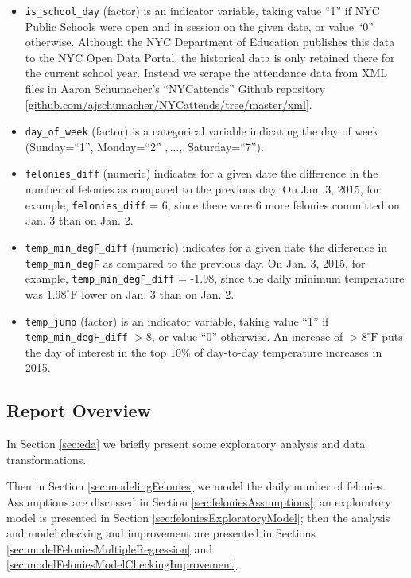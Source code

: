 \documentclass[11pt,notitlepage]{article}
\newcommand{\degf}{^\circ\text{F}}
\begin{document}
\begin{itemize}
\item \texttt{is_school_day} (factor) is an indicator variable, taking value ``1'' if NYC Public Schools were open and in session on the given date, or value ``0'' otherwise. Although the NYC Department of Education publishes this data to the NYC Open Data Portal, the historical data is only retained there for the current school year. Instead we scrape the attendance data from XML files in Aaron Schumacher's ``NYCattends'' Github repository [\href{https://github.com/ajschumacher/NYCattends/tree/master/xml}{github.com/ajschumacher/NYCattends/tree/master/xml}].


\item \texttt{day_of_week} (factor) is a categorical variable indicating the day of week (Sunday=``1'', Monday=``2'' $, \ldots, $ Saturday=``7''). 

\item \texttt{felonies_diff} (numeric) indicates for a given date the difference in the number of felonies as compared to the previous day. On Jan. 3, 2015, for example, \texttt{felonies_diff} = 6, since there were 6 more felonies committed on Jan. 3 than on Jan. 2.

\item \texttt{temp_min_degF_diff} (numeric) indicates for a given date the difference in \texttt{temp_min_degF} as compared to the previous day. On Jan. 3, 2015, for example, \texttt{temp_min_degF_diff} = -1.98, since the daily minimum temperature was $1.98 \degf$ lower on Jan. 3 than on Jan. 2.

\item \texttt{temp_jump} (factor) is an indicator variable, taking value ``1'' if \texttt{temp_min_degF_diff} $> 8$, or value ``0'' otherwise. An increase of $> 8 \degf$ puts the day of interest in the top 10\% of day-to-day temperature increases in 2015.

\end{itemize}



\subsection{Report Overview}

In Section \ref{sec:eda} we briefly present some exploratory analysis and data transformations.

Then in Section \ref{sec:modelingFelonies} we model the daily number of felonies. Assumptions are discussed in Section \ref{sec:feloniesAssumptions}; an exploratory model is presented in Section \ref{sec:feloniesExploratoryModel}; then the analysis and model checking and improvement are presented in Sections \ref{sec:modelFeloniesMultipleRegression} and \ref{sec:modelFeloniesModelCheckingImprovement}.
\end{document}
